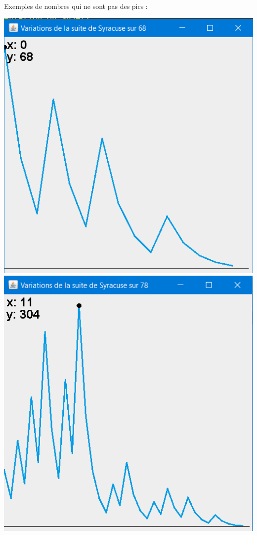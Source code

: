 \documentclass{beamer}
\begin{document}
\begin{frame}
Exemples de nombres qui ne sont pas des pics :
\begin{center}
\includegraphics[scale=0.45]{images/syracuse_var_68.PNG}
\includegraphics[scale=0.46]{images/syracuse_var_78.PNG}
\end{center}
\end{frame}
\end{document}
